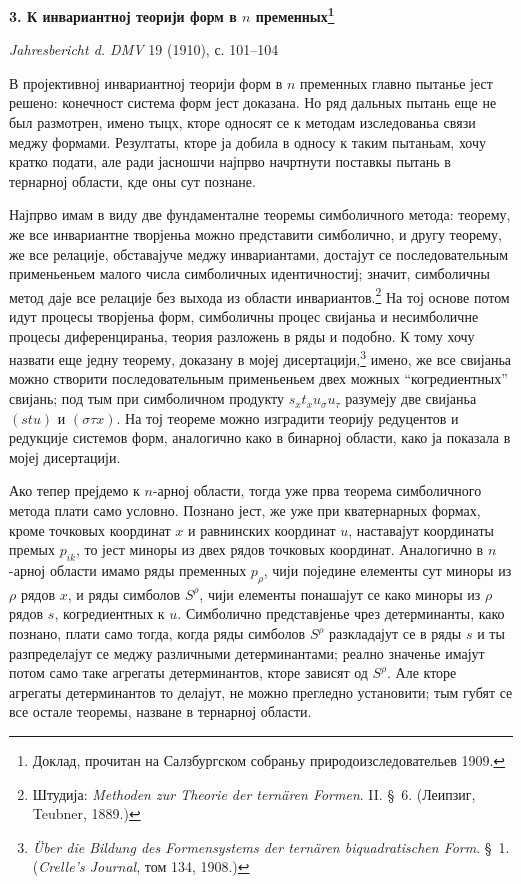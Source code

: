 ﻿\documentclass[11pt]{article}
\begin{document}
\begin{center}
{\Large\bfseries 3. К инвариантној теорији форм в $n$ пременных\footnote{Доклад, прочитан на Салзбургском собраньу природоизследовательев 1909.}}\par
\vspace{1.2em}
\emph{Jahresbericht d. DMV} 19 (1910), с. 101--104
\end{center}

\vspace{1em}
В пројективној инвариантној теорији форм в $n$ пременных главно пытанье јест решено: конечност система форм јест доказана. Но ряд дальных пытань еще не был размотрен, имено тыцх, кторе односят се к методам изследованьа связи меджу формами. Резултаты, кторе ја добила в односу к таким пытаньам, хочу кратко подати, але ради јасношчи најпрво начртнути поставкы пытань в тернарној области, кде оны сут познане.

Најпрво имам в виду две фундаменталне теоремы симболичного метода: теорему, же все инвариантне творјеньа можно представити симболично, и другу теорему, же все релације, обставајуче меджу инвариантами, достајут се последовательным применьеньем малого числа симболичных идентичностиј; значит, симболичны метод даје все релације без выхода из области инвариантов.\footnote{Штудија: \emph{Methoden zur Theorie der ternären Formen}. II. \S\ 6. (Леипзиг, Teubner, 1889.)} На тој основе потом идут процесы творјеньа форм, симболичны процес свијаньа и несимболичне процесы диференцираньа, теория разложень в ряды и подобно. К тому хочу назвати еще једну теорему, доказану в мојеј дисертацији,\footnote{\emph{Über die Bildung des Formensystems der ternären biquadratischen Form}. \S\ 1. (\emph{Crelle's Journal}, том 134, 1908.)} имено, же все свијаньа можно створити последовательным применьеньем двех можных ``когредиентных'' свијань; под тым при симболичном продукту $s_x t_x u_\sigma u_\tau$ разумеју две свијаньа $(stu)$ и $(\sigma\tau x)$. На тој теореме можно изградити теорију редуцентов и редукције системов форм, аналогично како в бинарној области, како ја показала в мојеј дисертацији.

Ако тепер прејдемо к $n$-арној области, тогда уже прва теорема симболичного метода плати само условно. Познано јест, же уже при кватернарных формах, кроме точковых координат $x$ и равнинских координат $u$, наставајут координаты премых $p_{ik}$, то јест миноры из двех рядов точковых координат. Аналогично в $n$-арној области имамо ряды пременных $p_\rho$, чији поједине елементы сут миноры из $\rho$ рядов $x$, и ряды симболов $S^\rho$, чији елементы понашајут се како миноры из $\rho$ рядов $s$, когредиентных к $u$. Симболично представјенье чрез детерминанты, како познано, плати само тогда, когда ряды симболов $S^\rho$ разкладајут се в ряды $s$ и ты разпределајут се меджу различными детерминантами; реално значенье имајут потом само таке агрегаты детерминантов, кторе зависят од $S^\rho$. Але кторе агрегаты детерминантов то делајут, не можно прегледно установити; тым губят се все остале теоремы, назване в тернарној области.
\end{document}
